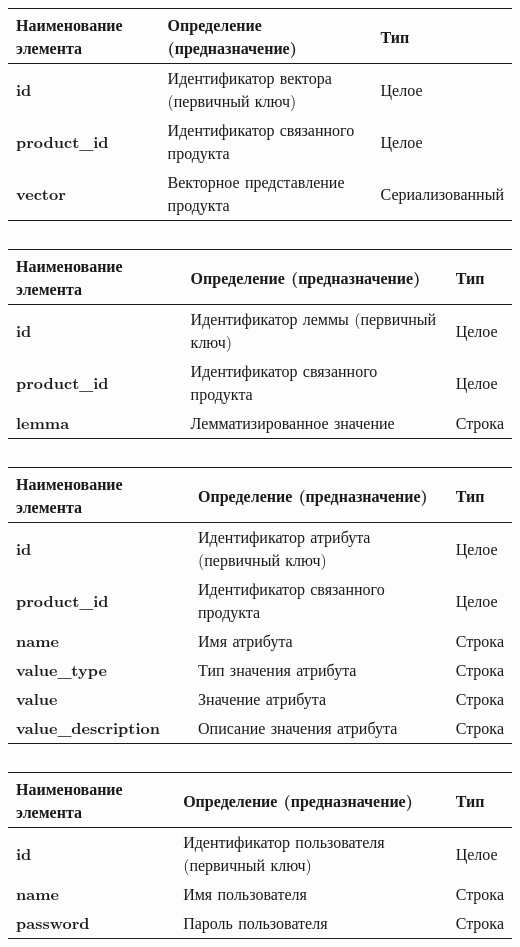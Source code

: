 \begin{longtable}{|p{3.5cm}|p{5cm}|p{5cm}|}
	\caption{} \\
	\hline
	\textbf{Наименование элемента}
	& \textbf{Определение (предназначение)}
	& \textbf{Тип} \\ \hline
	\endhead
	\textbf{id} & Идентификатор вектора (первичный ключ) & Целое \\ \hline
	\textbf{product\_id} & Идентификатор связанного продукта & Целое \\ \hline
	\textbf{vector} & Векторное представление продукта & Сериализованный \\ \hline
\end{longtable}

\begin{longtable}{|p{3.5cm}|p{5cm}|p{5cm}|}
	\caption{} \\
	\hline
	\textbf{Наименование элемента}
	& \textbf{Определение (предназначение)}
	& \textbf{Тип} \\ \hline
	\endhead
	\textbf{id} & Идентификатор леммы (первичный ключ) & Целое \\ \hline
	\textbf{product\_id} & Идентификатор связанного продукта & Целое \\ \hline
	\textbf{lemma} & Лемматизированное значение & Строка \\ \hline
\end{longtable}

\begin{longtable}{|p{3.5cm}|p{5cm}|p{5cm}|}
	\caption{} \\
	\hline
	\textbf{Наименование элемента}
	& \textbf{Определение (предназначение)}
	& \textbf{Тип} \\ \hline
	\endhead
	\textbf{id} & Идентификатор атрибута (первичный ключ) & Целое \\ \hline
	\textbf{product\_id} & Идентификатор связанного продукта & Целое \\ \hline
	\textbf{name} & Имя атрибута & Строка \\ \hline
	\textbf{value\_type} & Тип значения атрибута & Строка \\ \hline
	\textbf{value} & Значение атрибута & Строка \\ \hline
	\textbf{value\_description} & Описание значения атрибута & Строка \\ \hline
\end{longtable}

\begin{longtable}{|p{3.5cm}|p{5cm}|p{5cm}|}
	\caption{} \\
	\hline
	\textbf{Наименование элемента}
	& \textbf{Определение (предназначение)}
	& \textbf{Тип} \\ \hline
	\endhead
	\textbf{id} & Идентификатор пользователя (первичный ключ) & Целое \\ \hline
	\textbf{name} & Имя пользователя & Строка \\ \hline
	\textbf{password} & Пароль пользователя & Строка \\ \hline
\end{longtable}

